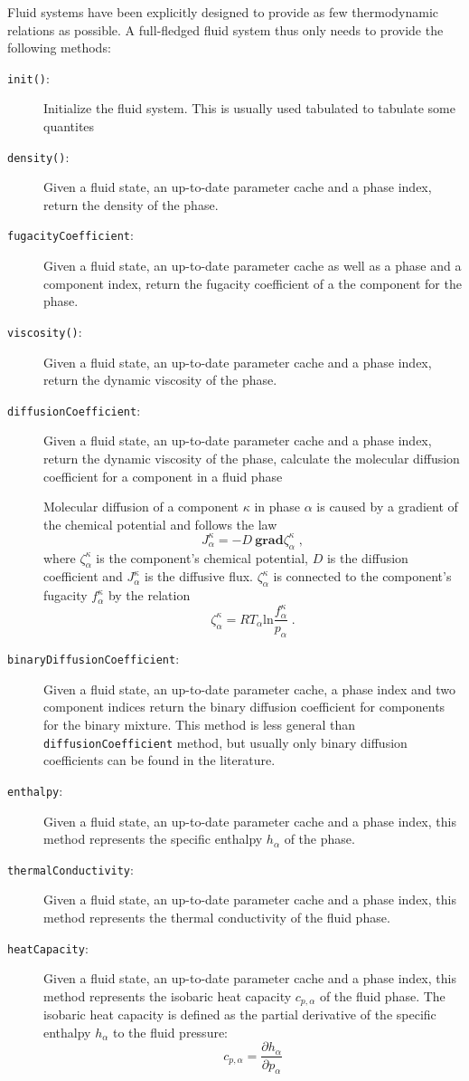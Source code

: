 Fluid systems have been explicitly designed to provide as few
thermodynamic relations as possible. A full-fledged fluid system thus
only needs to provide the following methods:
\begin{description}
\item[\texttt{init()}:] Initialize the fluid system. This is usually
  used tabulated to tabulate some quantites
\item[\texttt{density()}:] Given a fluid state, an up-to-date parameter
  cache and a phase index, return the density of the phase.
\item[\texttt{fugacityCoefficient}:] Given a fluid state, an up-to-date
  parameter cache as well as a phase and a component index, return the
  fugacity coefficient of a the component for the phase.
\item[\texttt{viscosity()}:] Given a fluid state, an up-to-date parameter
  cache and a phase index, return the dynamic viscosity of the phase.
\item[\texttt{diffusionCoefficient}:] Given a fluid state, an
  up-to-date parameter cache and a phase index, return the dynamic
  viscosity of the phase, calculate the molecular diffusion
  coefficient for a component in a fluid phase
  
  Molecular diffusion of a component $\kappa$ in phase $\alpha$ is
  caused by a gradient of the chemical potential and follows the law
  \[ 
  J^\kappa_\alpha = - D\ \mathbf{grad} \zeta^\kappa_\alpha\;,
  \] 
  where $\zeta^\kappa_\alpha$ is the component's chemical potential,
  $D$ is the diffusion coefficient and $J^\kappa_\alpha$ is the
  diffusive flux. $\zeta^\kappa_\alpha$ is connected to the
  component's fugacity $f^\kappa_\alpha$ by the relation
  \[ 
  \zeta^\kappa_\alpha = 
  R T_\alpha \mathrm{ln} \frac{f^\kappa_\alpha}{p_\alpha} \;.
  \]
\item[\texttt{binaryDiffusionCoefficient}:] Given a fluid state, an
  up-to-date parameter cache, a phase index and two
  component indices return the binary diffusion coefficient for
  components for the binary mixture. This method is less general than
  \texttt{diffusionCoefficient} method, but usually only binary
  diffusion coefficients can be found in the literature.
\item[\texttt{enthalpy}:] Given a fluid state, an up-to-date parameter
  cache and a phase index, this method represents the specific
  enthalpy $h_\alpha$ of the phase.
\item[\texttt{thermalConductivity}:] Given a fluid state, an
  up-to-date parameter cache and a phase index, this method represents
  the thermal conductivity of the fluid phase.
\item[\texttt{heatCapacity}:] Given a fluid state, an up-to-date
  parameter cache and a phase index, this method represents the
  isobaric heat capacity $c_{p,\alpha}$ of the fluid phase. The
  isobaric heat capacity is defined as the partial derivative of the
  specific enthalpy $h_\alpha$ to the fluid pressure:
  \[
  c_{p,\alpha} = \frac{\partial h_\alpha}{\partial p_\alpha}
  \]
\end{description}

